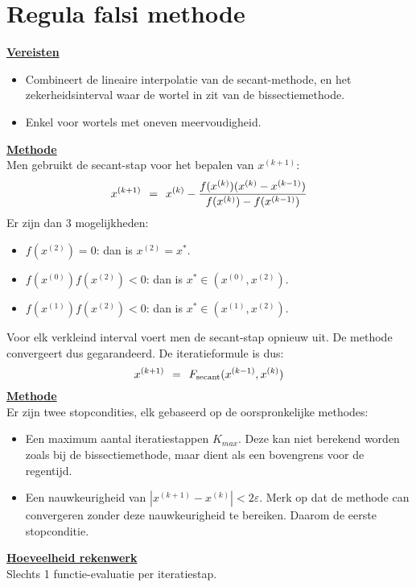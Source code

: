 \documentclass[11pt]{report}
\def \eq {\hspace{1.5mm}=\hspace{1.5mm}}
\begin{document}
\section{Regula falsi methode}
	\underline{\textbf{Vereisten}}
	\begin{itemize}
		\item Combineert de lineaire interpolatie van de secant-methode, en het zekerheidsinterval waar de wortel in zit van de bissectiemethode.
		\item Enkel voor wortels met oneven meervoudigheid.
	\end{itemize}
	\underline{\textbf{Methode}}\\
	Men gebruikt de secant-stap voor het bepalen van $x^{(k+1)}$:
	$$x^{(k+1)} \eq x^{(k)} - \frac{f(x^{(k)})(x^{(k)}-x^{(k-1)})}{f(x^{(k)}) - f(x^{(k-1)})}$$
	Er zijn dan 3 mogelijkheden:
	\begin{itemize}
		\item $f(x^{(2)}) = 0$: \hspace{10mm} dan is $x^{(2)} = x^*$.
		\item $f(x^{(0)})f(x^{(2)}) < 0$: dan is $x^* \in (x^{(0)}, x^{(2)})$.
		\item $f(x^{(1)})f(x^{(2)}) < 0$: dan is $x^* \in (x^{(1)}, x^{(2)})$.
	\end{itemize}
	Voor elk verkleind interval voert men de secant-stap opnieuw uit. De methode convergeert dus gegarandeerd. De iteratieformule is dus:
	$$x^{(k+1)} \eq F_{\text{secant}}(x^{(k-1)}, x^{(k)})$$
	\underline{\textbf{Methode}}\\
	Er zijn twee stopcondities, elk gebaseerd op de oorspronkelijke methodes:
	\begin{itemize}
		\item Een maximum aantal iteratiestappen $K_{max}$. Deze kan niet berekend worden zoals bij de bissectiemethode, maar dient als een bovengrens voor de regentijd.
		\item Een nauwkeurigheid van $|x^{(k+1)} - x^{(k)}| < 2\varepsilon$. Merk op dat de methode can convergeren zonder deze nauwkeurigheid te bereiken. Daarom de eerste stopconditie.
	\end{itemize}
	\underline{\textbf{Hoeveelheid rekenwerk}}\\
	Slechts 1 functie-evaluatie per iteratiestap.
	
\end{document}
